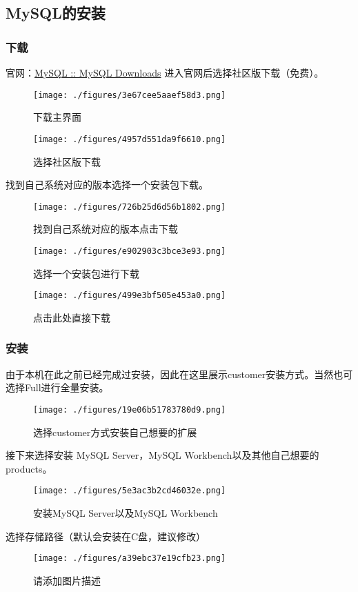 \subsection{MySQL的安装}

\subsubsection{下载}
官网：\href{https://www.mysql.com/downloads/}{MySQL :: MySQL Downloads}
进入官网后选择社区版下载（免费）。
\begin{figure}[ht]
\centering
\texttt{[image: ./figures/3e67cee5aaef58d3.png]}
\caption{下载主界面} \label{fig_MSQ001_3}
\end{figure}

\begin{figure}[ht]
\centering
\texttt{[image: ./figures/4957d551da9f6610.png]}
\caption{选择社区版下载} \label{fig_MSQ001_4}
\end{figure}
找到自己系统对应的版本选择一个安装包下载。
\begin{figure}[ht]
\centering
\texttt{[image: ./figures/726b25d6d56b1802.png]}
\caption{找到自己系统对应的版本点击下载} \label{fig_MSQ001_5}
\end{figure}

\begin{figure}[ht]
\centering
\texttt{[image: ./figures/e902903c3bce3e93.png]}
\caption{选择一个安装包进行下载} \label{fig_MSQ001_6}
\end{figure}

\begin{figure}[ht]
\centering
\texttt{[image: ./figures/499e3bf505e453a0.png]}
\caption{点击此处直接下载} \label{fig_MSQ001_7}
\end{figure}

\subsubsection{安装}
由于本机在此之前已经完成过安装，因此在这里展示customer安装方式。当然也可选择Full进行全量安装。
\begin{figure}[ht]
\centering
\texttt{[image: ./figures/19e06b51783780d9.png]}
\caption{选择customer方式安装自己想要的扩展} \label{fig_MSQ001_8}
\end{figure}

接下来选择安装 MySQL Server，MySQL Workbench以及其他自己想要的products。
\begin{figure}[ht]
\centering
\texttt{[image: ./figures/5e3ac3b2cd46032e.png]}
\caption{安装MySQL Server以及MySQL Workbench} \label{fig_MSQ001_9}
\end{figure}

选择存储路径（默认会安装在C盘，建议修改）
\begin{figure}[ht]
\centering
\texttt{[image: ./figures/a39ebc37e19cfb23.png]}
\caption{请添加图片描述} \label{fig_MSQ001_10}
\end{figure}